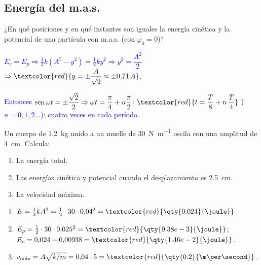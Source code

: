 \subsection{Energía del m.a.s.}

\begin{exercise}
    ¿En qué posiciones y en qué instantes son iguales la energía cinética y la potencial de una partícula con m.a.s.
    (con \(\varphi_0 = 0\))?
    \begin{solu}
        \textcolor{blue}{\(E_c = E_p \Rightarrow \frac{1}{2}k(A^2 - y^2) = \frac{1}{2}k y^2 \Rightarrow y^2 = \dfrac{A^2}{2}\)}
        \(\Rightarrow \textcolor{red}{y = \pm\dfrac{A}{\sqrt 2} \approx \pm 0{,}71\,A}\).

        \textcolor{blue}{Entonces \(\operatorname{sen}\omega t = \pm\dfrac{\sqrt 2}{2} \Rightarrow \omega t = \dfrac{\pi}{4} + n\dfrac{\pi}{2}\):}
        \(\textcolor{red}{t = \dfrac{T}{8} + n\,\dfrac{T}{4}}\) \textcolor{blue}{(\(n = 0, 1, 2\ldots\)): cuatro veces en cada período.}
    \end{solu}
\end{exercise}

\begin{exercise}
    Un cuerpo de \qty{1.2}{\kg} unido a un muelle de \qty{30}{\newton\per\m} oscila con una amplitud de \qty{4}{\cm}. Calcula:
    \begin{enumerate}[label=\letraminuscula]
        \item La energía total.
        \item Las energías cinética y potencial cuando el desplazamiento es \qty{2.5}{\cm}.
        \item La velocidad máxima.
    \end{enumerate}
    \begin{solu}
        \begin{enumerate}[label=\letraminuscula]
            \item \(E = \frac{1}{2}kA^2 = \frac{1}{2}\cdot 30\cdot 0{,}04^2 = \textcolor{red}{\qty{0.024}{\joule}}\).
            \item \(E_p = \frac{1}{2}\cdot 30\cdot 0{,}025^2 = \textcolor{red}{\qty{9.38e-3}{\joule}}\); \(E_c = 0{,}024 - 0{,}00938 = \textcolor{red}{\qty{1.46e-2}{\joule}}\).
            \item \(v_{\text{máx}} = A\sqrt{k/m} = 0{,}04\cdot 5 = \textcolor{red}{\qty{0.2}{\m\per\second}}\).
        \end{enumerate}
    \end{solu}
\end{exercise}

